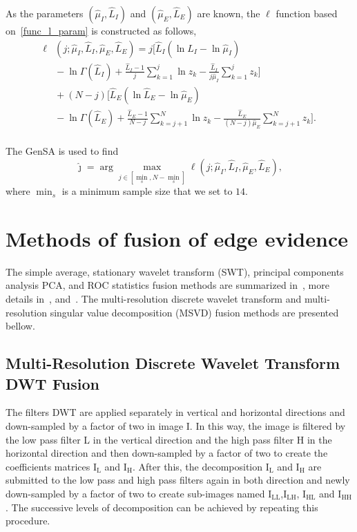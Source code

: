 \documentclass[journal]{IEEEtran}
\begin{document}
As the parameters $(\widehat{\mu}_I, \widehat{L}_I)$ and $(\widehat{\mu}_E, \widehat{L}_E)$ are known, the $\ell$ function based on~\eqref{func_l_param} is constructed as follows,
\begin{equation}\label{l_com_paremetros}
 \begin{split}
\ell&(j;\widehat{\mu}_I, \widehat{L}_I,\widehat{\mu}_E, \widehat{L}_E)=j\Bigg[  \widehat{L}_I(\ln \widehat{L}_I -\ln \widehat{\mu}_I) \\
                                          &{}- \ln \Gamma(\widehat{L}_I) + \frac{\widehat{L}_I  - 1}{j} \sum_{k=1}^{j}  \ln z_k -\frac{\widehat{L}_I}{j\widehat{\mu}_I} \sum_{k=1}^{j}   z_k\Bigg] \\
                                   &{}+(N-j)\Bigg[\widehat{L}_E(\ln \widehat{L}_E - \ln \widehat{\mu}_E)\\
                                   &{}-\ln \Gamma(\widehat{L}_E) + \frac{\widehat{L}_E - 1}{N-j} \sum_{k=j+1}^{N}\ln z_k
                                   -\frac{\widehat{L}_E}{(N-j)\widehat{\mu}_E} \sum_{k=j+1}^{N}z_k\Bigg]. \\
 \end{split}
 \end{equation}
 
The GenSA is used to find  
$$
\widehat{\jmath}= \arg\max\limits_{j\in [\min_s,N-\min_s]}\ell(j;\widehat{\mu}_I, \widehat{L}_I,\widehat{\mu}_E, \widehat{L}_E),
$$ 
where $\min_s$ is a minimum sample size that we set to $14$.

\section{Methods of fusion of edge evidence}\label{sec_04}

 The simple average, stationary wavelet transform (SWT), principal components analysis PCA, and ROC statistics fusion methods are summarized in~\cite{bmf_2019}, more details in~\cite{n_r,mit,gs}, and~\cite{fawcett}. The multi-resolution discrete wavelet transform and multi-resolution singular value decomposition (MSVD) fusion methods are presented bellow.

\subsection{Multi-Resolution Discrete Wavelet Transform DWT Fusion~\cite{n_r}}  
The filters DWT are applied separately in vertical and horizontal directions and down-sampled by a factor of two in image I. In this way, the image is filtered by the low pass filter L in the vertical direction and the high pass filter H in the horizontal direction and then down-sampled by a factor of two to create the coefficients matrices $\text{I}_\text{L}$ and $\text{I}_\text{H}$. After this, the decomposition $\text{I}_\text{L}$ and $\text{I}_\text{H}$ are submitted to the low pass and high pass filters again  in both direction and newly down-sampled by a factor of two to create sub-images named $\text{I}_\text{LL}$,$\text{I}_\text{LH}$, $\text{I}_\text{HL}$ and $\text{I}_\text{HH}$. The successive levels of decomposition can be achieved by repeating this procedure.
\end{document}
